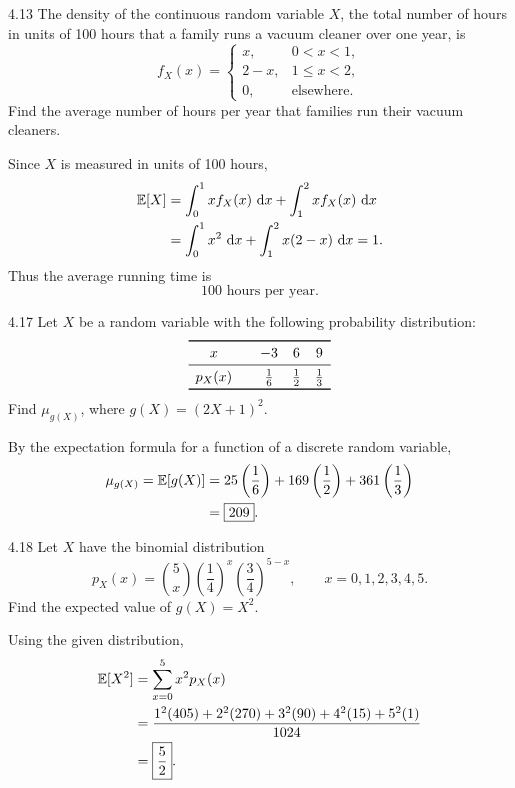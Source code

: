 \documentclass[11pt,oneside]{article}
\begin{document}
\begin{exercise}{4.13}
The density of the continuous random variable $X$, the total number of hours in units of 100 hours that a family runs a vacuum cleaner over one year, is
\[
    f_X(x)=\begin{cases}x,&0<x<1,\\2-x,&1\le x<2,\\0,&\text{elsewhere}.\end{cases}
\]
Find the average number of hours per year that families run their vacuum cleaners.
\end{exercise}
\begin{solution}
Since $X$ is measured in units of 100 hours,
\[
\begin{aligned}
    \mathbb{E}[X]&=\int_0^1 x f_X(x)\,\mathop{}\!\mathrm{d} x+\int_1^2 x f_X(x)\,\mathop{}\!\mathrm{d} x\\
    &=\int_0^1 x^2\,\mathop{}\!\mathrm{d} x+\int_1^2 x(2-x)\,\mathop{}\!\mathrm{d} x=1.
\end{aligned}
\]
Thus the average running time is
\[\boxed{100\text{ hours per year}}.\]
\end{solution}

\begin{exercise}{4.17}
Let $X$ be a random variable with the following probability distribution:
\[
\begin{array}{c@{\qquad}ccc}
\toprule
x & -3 & 6 & 9 \\
\midrule
p_X(x) & \frac16 & \frac12 & \frac13 \\
\bottomrule
\end{array}
\]
Find $\mu_{g(X)}$, where $g(X)=(2X+1)^2$.
\end{exercise}
\begin{solution}
By the expectation formula for a function of a discrete random variable,
\[
\begin{aligned}
    \mu_{g(X)}=\mathbb{E}[g(X)]&=25\left(\frac16\right)+169\left(\frac12\right)+361\left(\frac13\right)\\
    &=\boxed{209}.
\end{aligned}
\]
\end{solution}

\begin{exercise}{4.18}
Let $X$ have the binomial distribution
\[p_X(x)=\binom{5}{x}\left(\frac14\right)^x\left(\frac34\right)^{5-x},\qquad x=0,1,2,3,4,5.\]
Find the expected value of $g(X)=X^2$.
\end{exercise}
\begin{solution}
Using the given distribution,
\[
\begin{aligned}
    \mathbb{E}[X^2]&=\sum_{x=0}^{5}x^2 p_X(x)\\
    &=\frac{1^2(405)+2^2(270)+3^2(90)+4^2(15)+5^2(1)}{1024}\\
    &=\boxed{\frac52}.
\end{aligned}
\]
\end{solution}
\end{document}
